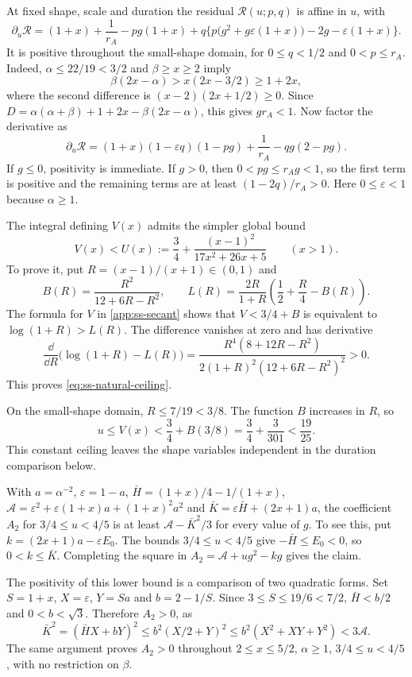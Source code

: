  At fixed shape, scale and duration the residual
$\mathcal R(u;p,q)$ is affine in $u$, with
\[
  \partial_u\mathcal R=(1+x)+\frac1{r_A}-pg(1+x)+q\bigl\{p\bigl(g^2+g\varepsilon(1+x)\bigr)-2g
  -\varepsilon(1+x)\bigr\}.
\]
It is positive throughout the small-shape domain, for $0\le q<1/2$ and $0<p\le r_A$.
Indeed, $\alpha\le22/19<3/2$ and $\beta\ge x\ge2$ imply
\[
 \beta(2x-\alpha)>x(2x-3/2)\ge1+2x,
\]
where the second difference is $(x-2)(2x+1/2)\ge0$. Since
$D=\alpha(\alpha+\beta)+1+2x-\beta(2x-\alpha)$, this gives $gr_A<1$.
Now factor the derivative as
\[
 \partial_u\mathcal R=(1+x)(1-\varepsilon q)(1-pg)
             +\frac1{r_A}-qg(2-pg).
\]
If $g\le0$, positivity is immediate. If $g>0$, then $0<pg\le r_Ag<1$,
so the first term is positive and the remaining terms are at least
$(1-2q)/r_A>0$. Here $0\le\varepsilon<1$ because $\alpha\ge1$.

 The integral defining $V(x)$ admits the simpler global bound
\begin{equation}\label{eq:ss-natural-ceiling}
 V(x)<U(x):=\frac34+\frac{(x-1)^2}{17x^2+26x+5}\qquad(x>1).
\end{equation}
To prove it, put $R=(x-1)/(x+1)\in(0,1)$ and
\[
 B(R)=\frac{R^2}{12+6R-R^2},\qquad
 L(R)=\frac{2R}{1+R}\left(\frac12+\frac R4-B(R)\right).
\]
The formula for $V$ in \cref{app:ss-secant} shows that $V<3/4+B$ is equivalent to
$\log(1+R)>L(R)$. The difference vanishes at zero and has derivative
\[
 \frac{\dd}{\dd R}\bigl(\log(1+R)-L(R)\bigr)
 =\frac{R^4(8+12R-R^2)}{2(1+R)^2(12+6R-R^2)^2}>0.
\]
This proves \eqref{eq:ss-natural-ceiling}.

On the small-shape domain, $R\le7/19<3/8$. The function $B$ increases in $R$, so
\[
 u\le V(x)<\frac34+B(3/8)=\frac34+\frac3{301}<\frac{19}{25}.
\]
This constant ceiling leaves the shape variables independent in the duration comparison below.

 With $a=\alpha^{-2}$, $\varepsilon=1-a$,
$\bar H=(1+x)/4-1/(1+x)$, $\mathcal A=\varepsilon^2+\varepsilon(1+x)a+(1+x)^2a^2$ and
$\bar K=\varepsilon\bar H+(2x+1)a$, the coefficient $A_2$ for $3/4\le u<4/5$ is at least
$\mathcal A-\bar K^2/3$ for every value of $g$. To see this, put
$k=(2x+1)a-\varepsilon E_0$. The bounds $3/4\le u<4/5$ give
$-\bar H\le E_0<0$, so $0<k\le\bar K$. Completing the square in
$A_2=\mathcal A+ug^2-kg$ gives the claim.

The positivity of this lower bound is a comparison of two quadratic forms. Set
$S=1+x$, $X=\varepsilon$, $Y=Sa$ and $b=2-1/S$. Since $3\le S\le19/6<7/2$,
$\bar H<b/2$ and $0<b<\sqrt3$. Therefore $A_2>0$, as
\[
 \bar K^2=(\bar HX+bY)^2
 \le b^2(X/2+Y)^2\le b^2(X^2+XY+Y^2)<3\mathcal A.
\]
The same argument proves $A_2>0$ throughout $2\le x\le5/2$,
$\alpha\ge1$, $3/4\le u<4/5$, with no restriction on $\beta$.


